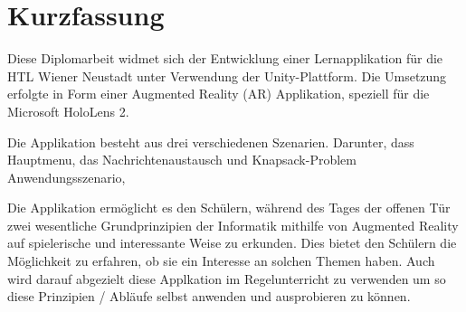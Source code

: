 \chapter{Kurzfassung}
Diese Diplomarbeit widmet sich der Entwicklung einer Lernapplikation für die HTL Wiener Neustadt unter Verwendung
der Unity-Plattform. Die Umsetzung erfolgte in Form einer Augmented Reality (AR) Applikation, speziell für die
Microsoft HoloLens 2.

Die Applikation besteht aus drei verschiedenen Szenarien. Darunter, dass Hauptmenu, das Nachrichtenaustausch und Knapsack-Problem
Anwendungsszenario,

Die Applikation ermöglicht es den Schülern, während des Tages der offenen Tür zwei wesentliche Grundprinzipien der
Informatik mithilfe von Augmented Reality auf spielerische und interessante Weise zu erkunden. Dies bietet den
Schülern die Möglichkeit zu erfahren, ob sie ein Interesse an solchen Themen haben. Auch wird darauf abgezielt diese
Applkation im Regelunterricht zu verwenden um so diese Prinzipien / Abläufe selbst anwenden und ausprobieren zu können.

